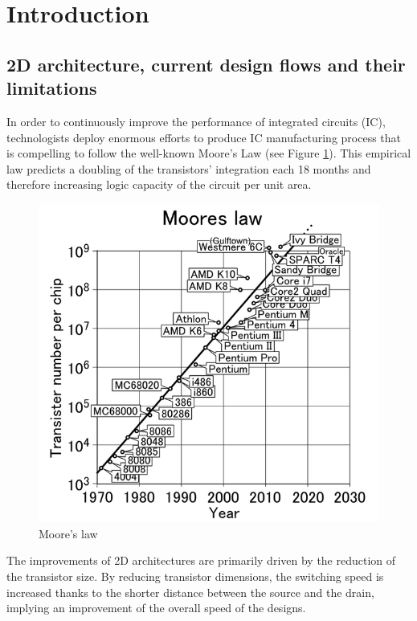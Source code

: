\chapter*{Introduction}
\fancyhead[LO]{} 

\section*{2D architecture, current design flows and their limitations}
In order to continuously improve the performance of integrated circuits (IC), technologists deploy enormous efforts to produce IC manufacturing process that is compelling to follow the well-known Moore's Law (see Figure \ref{fig:mooreslaw}). This empirical law predicts a doubling of the transistors' integration each 18 months and therefore increasing logic capacity of the circuit per unit area. 

\begin{figure}
\begin{center}
\includegraphics[width=0.75\linewidth]{mooreslaw.png}
\end{center}
\vspace{-0.5cm}
\caption{Moore's law \cite{mooreslawpic}}
\label{fig:mooreslaw}
\end{figure}

The improvements of 2D architectures are primarily driven by the reduction of the transistor size. By reducing transistor dimensions, the switching speed is increased thanks to the shorter distance between the source and the drain, implying an improvement of the overall speed of the designs.

